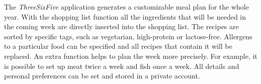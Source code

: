 The \textit{ThreeSixFive} application generates a customizable meal plan for the whole year.
With the shopping list function all the ingredients that will be needed in the coming week are directly inserted into the shopping list.
The recipes are sorted by specific tags, such as vegetarian, high-protein or lactose-free. Allergens to a particular food can be specified and all recipes that contain it will be replaced. An extra function helps to plan the week more precisely. For example, it is possible to set up meat twice a week and fish once a week. All details and personal preferences can be set and stored in a private account.
